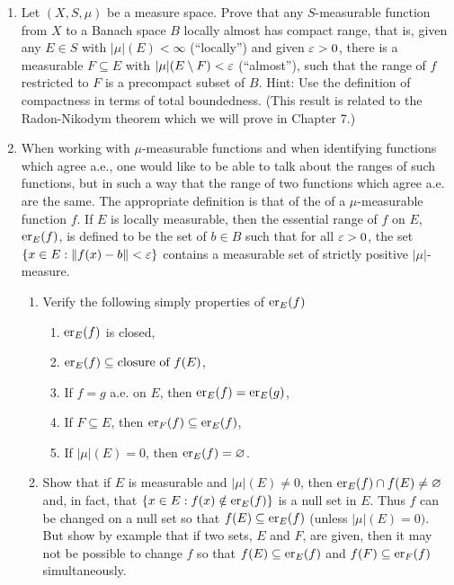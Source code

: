 \begin{enumerate}[label=\arabic*),ref=\arabic*]
\item Let $(X,S,\mu)$ be a measure space. Prove that any $S$-measurable function from $X$ to a Banach space $B$ locally almost has compact range, that is, given any $E\in S$ with $|\mu|(E)<\infty$ (``locally'') and given $\ep>0$, there is a measurable $F\subseteq E$ with $|\mu|(E\sd F)<\ep$ (``almost''), such that the range of $f$ restricted to $F$ is a precompact subset of $B$. Hint: Use the definition of compactness in terms of total boundedness. (This result is related to the Radon-Nikodym theorem which we will prove in Chapter 7.) %

\item\label{exer:essential range}
When working with $\mu$-measurable functions and when identifying functions which agree a.e., one would like to be able to talk about the ranges of such functions, but in such a way that the range of two functions which agree a.e. are the same. The appropriate definition is that of the  of a $\mu$-measurable function $f$. If $E$ is locally measurable, then the essential range of $f$ on $E$, $\er{f}{E}$, is defined to be the set of $b \in B$ such that for all $\ep>0$, the set $\brc{x\in E:\norm{f(x)-b}<\ep}$ contains a measurable set of strictly positive $|\mu|$-measure. %
\begin{enumerate}
    \item Verify the following simply properties of $\er{f}{E}$
    \begin{enumerate}[label=\arabic*)]
        \item $\er{f}{E}$ is closed,
        \item $\er{f}{E}\subseteq\text{closure of }f(E)$,
        \item If $f=g$ a.e. on $E$, then $\er{f}{E}=\er{g}{E}$,
        \item If $F\subseteq E$, then $\er{f}{F}\subseteq\er{f}{E}$,
        \item If $|\mu|(E)=0$, then $\er{f}{E}=\varnothing$.
    \end{enumerate}
    
    \item Show that if $E$ is measurable and $|\mu|(E)\neq 0$, then $\er{f}{E}\cap f(E)\neq\varnothing$ and, in fact, that $\brc{x \in E: f(x)\notin\er{f}{E}}$ is a null set in $E$. Thus $f$ can be changed on a null set so that $f(E) \subseteq\er{f}{E}$ (unless $|\mu|(E)=0)$. But show by example that if two sets, $E$ and $F$, are given, then it may not be possible to change $f$ so that $f(E)\subseteq\er{f}{E}$ and $f(F)\subseteq\er{f}{F}$ simultaneously.
    

\end{enumerate}
\end{enumerate}
